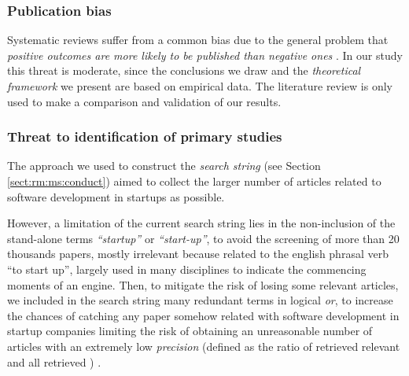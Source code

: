 \documentclass[final,5p,times,twocolumn]{elsarticle}
\begin{document}
\subsubsection{Publication bias}
\label{sect:rm:ms:validity:pub}

Systematic reviews suffer from a common bias due to the general problem that \textit{positive outcomes are more likely to be published than negative ones}  \cite{Unterkalmsteiner2012}.
In our study this threat is moderate, since the conclusions we draw and the \textit{theoretical framework} we present are based on empirical data. The literature review is only used to make a comparison and validation of our results.
\subsubsection{Threat to identification of primary studies}
\label{sect:rm:ms:validity:thre}

The approach we used to construct the \textit{search string} (see Section \ref{sect:rm:ms:conduct}) aimed to collect the larger number of articles related to software development in startups as possible.

However, a limitation of the current search string lies in the non-inclusion of the stand-alone terms \textit{``startup''} or \textit{``start-up''}, to avoid the screening of more than 20 thousands papers, mostly irrelevant because related to the english phrasal verb ``to start up'', largely used in many disciplines to indicate the commencing moments of an engine. Then, to mitigate the risk of losing some relevant articles, we included in the search string many redundant terms in logical \textit{or}, to increase the chances of catching any paper somehow related with software development in startup companies limiting the risk of obtaining an unreasonable number of articles with an extremely low \textit{precision} (defined as the ratio of retrieved relevant and all retrieved \cite{Saracevic1995}) .
\end{document}
